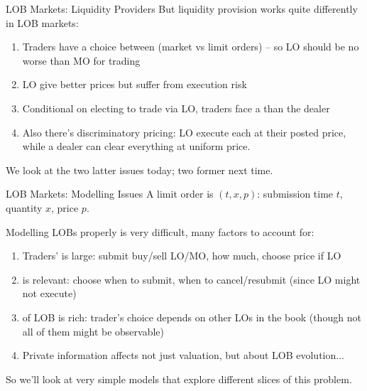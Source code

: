 \documentclass[english,10pt
,aspectratio=169
]{beamer}
\begin{document}
\begin{frame}{LOB Markets: Liquidity Providers}
	But \alert{liquidity provision} works quite differently in LOB markets:
	\begin{enumerate}
		\item Traders have a choice between  (market vs limit orders) -- so LO should be no worse than MO for trading
		\item LO give better prices but suffer from execution risk
		\item Conditional on electing to trade via LO, traders face a  than the dealer
		\item Also there's discriminatory pricing: LO execute each at their posted price, while a dealer can clear everything at uniform price.
	\end{enumerate}
	We look at the two latter issues today; two former next time.
\end{frame}


\begin{frame}{LOB Markets: Modelling Issues}
	A limit order is $(t,x,p)$: submission time $t$, quantity $x$, price $p$.
	
	Modelling LOBs properly is very difficult, many factors to account for:
	\begin{enumerate}
		\item Traders'  is large: submit buy/sell LO/MO, how much, choose price if LO
		\item {} is relevant: choose when to submit, when to cancel/resubmit (since LO might not execute)
		\item {} of LOB is rich: trader's choice depends on other LOs in the book (though not all of them might be observable)
		\item Private information affects not just valuation, but  about LOB evolution...
	\end{enumerate}
	So we'll look at very simple models that explore different slices of this problem.
\end{frame}
\end{document}
